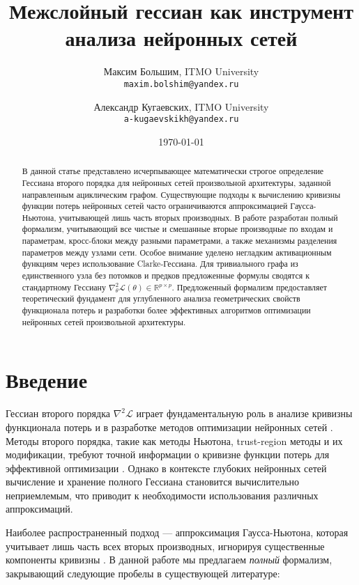 \documentclass[11pt]{article}
\title{Межслойный гессиан как инструмент анализа нейронных сетей}
\author{Максим Большим, ITMO University \\ \texttt{maxim.bolshim@yandex.ru}
  \and
  Александр Кугаевских, ITMO University \\ \texttt{a-kugaevskikh@yandex.ru}
}
\date{\today}
\begin{document}
\sloppy
\maketitle

\begin{abstract}
  В данной статье представлено исчерпывающее математически строгое определение Гессиана второго порядка для
  нейронных сетей произвольной архитектуры, заданной направленным ациклическим графом. Существующие подходы к
  вычислению кривизны функции потерь нейронных сетей часто ограничиваются аппроксимацией Гаусса-Ньютона,
  учитывающей лишь часть вторых производных. В работе разработан полный формализм, учитывающий все чистые и
  смешанные вторые производные по входам и параметрам, кросс-блоки между разными параметрами, а также
  механизмы разделения параметров между узлами сети. Особое внимание уделено негладким активационным функциям
  через использование Clarke-Гессиана. Для тривиального графа из единственного узла без потомков и предков
  предложенные формулы сводятся к стандартному Гессиану $\nabla^2_\theta\mathcal
  L(\theta)\in\mathbb{R}^{p\times p}$. Предложенный формализм предоставляет теоретический фундамент для
  углубленного анализа геометрических свойств функционала потерь и разработки более эффективных алгоритмов
  оптимизации нейронных сетей произвольной архитектуры.
\end{abstract}

\section{Введение}
Гессиан второго порядка $\nabla^2\mathcal L$ играет фундаментальную роль в анализе кривизны функционала
потерь и в разработке методов оптимизации нейронных сетей \citep{martens2014optimizing,
pascanu2013revisiting}. Методы второго порядка, такие как методы Ньютона, trust-region методы и их
модификации, требуют точной информации о кривизне функции потерь для эффективной оптимизации
\citep{nocedal2006numerical}. Однако в контексте глубоких нейронных сетей вычисление и хранение полного
Гессиана становится вычислительно неприемлемым, что приводит к необходимости использования различных аппроксимаций.

Наиболее распространенный подход — аппроксимация Гаусса-Ньютона, которая учитывает лишь часть всех вторых
производных, игнорируя существенные компоненты кривизны \citep{schraudolph2002fast, martens2010deep}. В
данной работе мы предлагаем \emph{полный} формализм, закрывающий следующие пробелы в существующей литературе:
\end{document}
